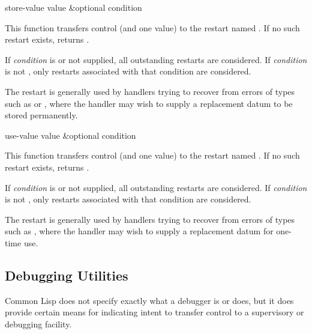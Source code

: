 \begin{defun}[Function]
store-value value &optional condition

This function transfers control (and one value) to the restart named
. If no such restart exists,  returns
.

If \emph{condition} is  or not supplied, all outstanding restarts are
considered.  If \emph{condition} is not , only restarts associated with
that condition are considered.

The  restart is generally used by handlers trying to recover
from errors of types such as  or , where the
handler may wish to supply a replacement datum to be stored permanently.
\end{defun}

\begin{defun}[Function]
use-value value &optional condition

This function transfers control (and one value) to the restart named
. If no such restart exists,  returns .

If \emph{condition} is  or not supplied, all outstanding restarts are
considered.  If \emph{condition} is not , only restarts associated with
that condition are considered.

The  restart is generally used by handlers trying to recover from
errors of types such as , where the handler may wish to supply a
replacement datum for one-time use.
\end{defun}

\subsection{Debugging Utilities}
\label{DEBUGGING-UTILITIES}

Common Lisp does not specify exactly what a debugger is or does,
but it does provide certain means for indicating intent to transfer control
to a supervisory or debugging facility.

